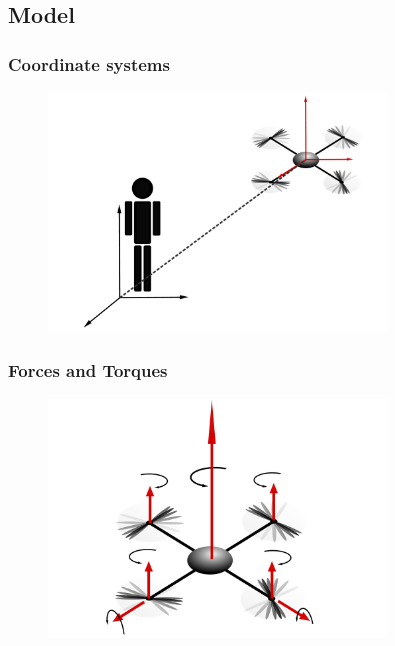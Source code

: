 
\begin{frame}
		\section{Model}
		\frametitle{Coordinate systems}
			\begin{figure}[p]
				\centering
				\includegraphics[width=0.8\textwidth]{images/Koordinatensysteme.pdf}
				\label{fig:Koordinatensysteme}
		\end{figure}
\end{frame}

\begin{frame}
		\frametitle{Forces and Torques}
		\begin{figure}[p]
			\centering
			\includegraphics[width=0.8\textwidth]{images/Kraefte.pdf}
			\label{fig:Kraefte}
		\end{figure}
	\end{frame}

